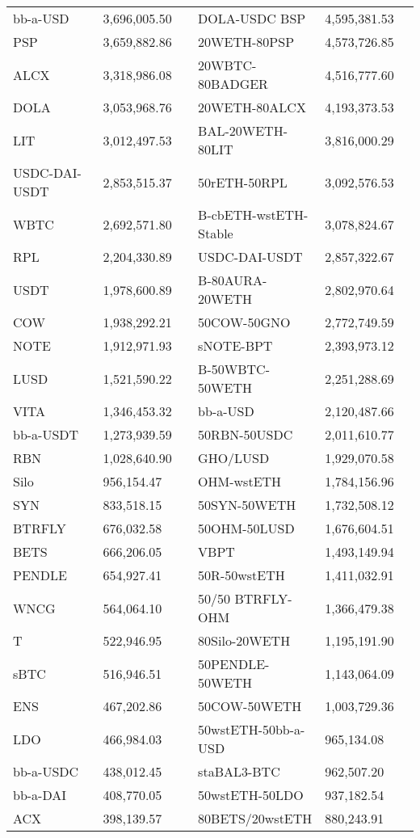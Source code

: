 \begin{longtable}{@{}p{0.25\linewidth}p{0.25\linewidth}p{0.25\linewidth}p{0.25\linewidth}@{}}
bb-a-USD & 3,696,005.50 & DOLA-USDC BSP & 4,595,381.53 \\
PSP & 3,659,882.86 & 20WETH-80PSP & 4,573,726.85 \\
ALCX & 3,318,986.08 & 20WBTC-80BADGER & 4,516,777.60 \\
DOLA & 3,053,968.76 & 20WETH-80ALCX & 4,193,373.53 \\
LIT & 3,012,497.53 & BAL-20WETH-80LIT & 3,816,000.29 \\
USDC-DAI-USDT & 2,853,515.37 & 50rETH-50RPL & 3,092,576.53 \\
WBTC & 2,692,571.80 & B-cbETH-wstETH-Stable & 3,078,824.67 \\
RPL & 2,204,330.89 & USDC-DAI-USDT & 2,857,322.67 \\
USDT & 1,978,600.89 & B-80AURA-20WETH & 2,802,970.64 \\
COW & 1,938,292.21 & 50COW-50GNO & 2,772,749.59 \\
NOTE & 1,912,971.93 & sNOTE-BPT & 2,393,973.12 \\
LUSD & 1,521,590.22 & B-50WBTC-50WETH & 2,251,288.69 \\
VITA & 1,346,453.32 & bb-a-USD & 2,120,487.66 \\
bb-a-USDT & 1,273,939.59 & 50RBN-50USDC & 2,011,610.77 \\
RBN & 1,028,640.90 & GHO/LUSD & 1,929,070.58 \\
Silo & 956,154.47 & OHM-wstETH & 1,784,156.96 \\
SYN & 833,518.15 & 50SYN-50WETH & 1,732,508.12 \\
BTRFLY & 676,032.58 & 50OHM-50LUSD & 1,676,604.51 \\
BETS & 666,206.05 & VBPT & 1,493,149.94 \\
PENDLE & 654,927.41 & 50R-50wstETH & 1,411,032.91 \\
WNCG & 564,064.10 & 50/50 BTRFLY-OHM & 1,366,479.38 \\
T & 522,946.95 & 80Silo-20WETH & 1,195,191.90 \\
sBTC & 516,946.51 & 50PENDLE-50WETH & 1,143,064.09 \\
ENS & 467,202.86 & 50COW-50WETH & 1,003,729.36 \\
LDO & 466,984.03 & 50wstETH-50bb-a-USD & 965,134.08 \\
bb-a-USDC & 438,012.45 & staBAL3-BTC & 962,507.20 \\
bb-a-DAI & 408,770.05 & 50wstETH-50LDO & 937,182.54 \\
ACX & 398,139.57 & 80BETS/20wstETH & 880,243.91 \\

\end{longtable}

